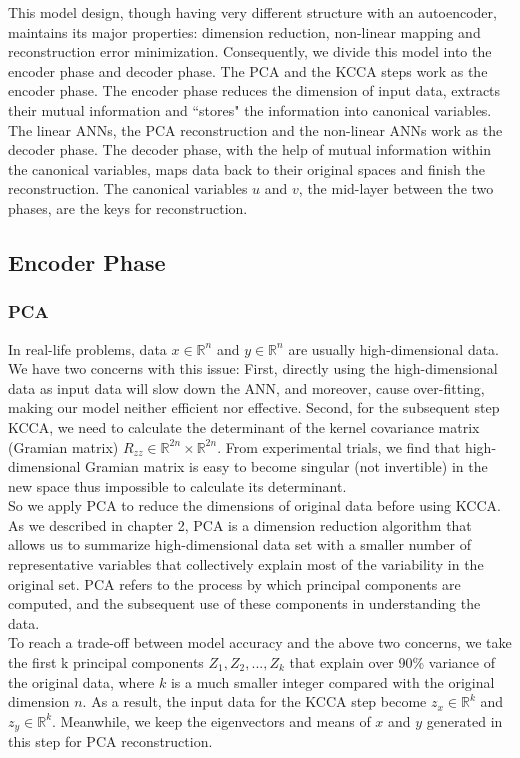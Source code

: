 \documentclass[12pt]{report} %
\begin{document}
This model design, though having very different structure with an autoencoder, maintains its major properties: dimension reduction, non-linear mapping and reconstruction error minimization. Consequently, we divide this model into the encoder phase and decoder phase. The PCA and the KCCA steps work as the encoder phase. The encoder phase reduces the dimension of input data, extracts their mutual information and ``stores" the information into canonical variables. The linear ANNs, the PCA reconstruction and the non-linear ANNs work as the decoder phase. The decoder phase, with the help of mutual information within the canonical variables, maps data back to their original spaces and finish the reconstruction. The canonical variables $u$ and $v$, the mid-layer between the two phases, are the keys for reconstruction. 

\subsection{Encoder Phase}
\subsubsection{PCA}
In real-life problems, data $x\in \mathbb{R}^{n}$ and $y\in \mathbb{R}^{n}$ are usually high-dimensional data. We have two concerns with this issue: First, directly using the high-dimensional data as input data will slow down the ANN, and moreover, cause over-fitting\cite{STAT}, making our model neither efficient nor effective. Second, for the subsequent step KCCA, we need to calculate the determinant of the kernel covariance matrix (Gramian matrix) $R_{zz} \in \mathbb{R}^{2n} \times \mathbb{R}^{2n}$. From experimental trials, we find that high-dimensional Gramian matrix is easy to become singular (not invertible) in the new space thus impossible to calculate its determinant.\\
So we apply PCA to reduce the dimensions of original data before using KCCA. As we described in chapter 2, PCA is a dimension reduction algorithm that allows us to summarize high-dimensional data set with a smaller number of representative variables that collectively explain most of the variability in the original set. PCA refers to the process by which principal components are computed, and the subsequent use of these components in understanding the data.\\
To reach a trade-off between model accuracy and the above two concerns, we take the first k principal components \(Z_{1}, Z_{2},...,Z_{k}\) that explain over 90\% variance of the original data, where $k$ is a much smaller integer compared with the original dimension $n$. As a result, the input data for the KCCA step become $z_x\in \mathbb{R}^{k}$ and $z_y\in \mathbb{R}^{k}$. Meanwhile, we keep the eigenvectors and means of $x$ and $y$ generated in this step for PCA reconstruction.
\end{document}
